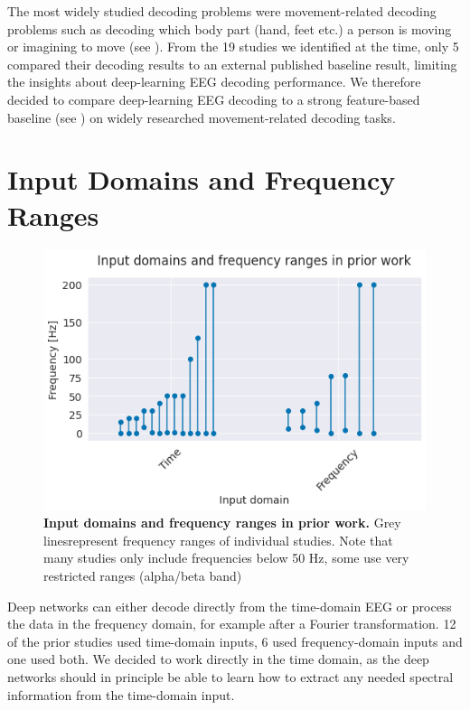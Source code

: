     The most widely studied decoding problems were movement-related decoding
problems such as decoding which body part (hand, feet etc.) a person is
moving or imagining to move (see
). From the 19 studies we
identified at the time, only 5 compared their decoding results to an
external published baseline result, limiting the insights about
deep-learning EEG decoding performance. We therefore decided to compare
deep-learning EEG decoding to a strong feature-based baseline (see
) on widely researched
movement-related decoding tasks.

\section{Input Domains and Frequency
Ranges}\label{input-domains-and-frequency-ranges}


\begin{figure}[th]
    \myfloatalign
    \includegraphics[width=1\linewidth]{latex_images/PriorWork_files/PriorWork_7_0.png}
    \caption[Input domains and frequency ranges in prior work.]{\textbf{Input domains and frequency ranges in prior work.} Grey linesrepresent frequency ranges of individual studies. Note that many studies
only include frequencies below 50 Hz, some use very restricted ranges
(alpha/beta band)}\label{input_domain_fig}
\end{figure}
    

    Deep networks can either decode directly from the time-domain EEG or
process the data in the frequency domain, for example after a Fourier
transformation. 12 of the prior studies used time-domain inputs, 6 used
frequency-domain inputs and one used both. We decided to work directly
in the time domain, as the deep networks should in principle be able to
learn how to extract any needed spectral information from the
time-domain input.

